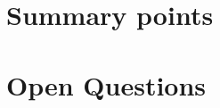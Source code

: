 \documentclass[11pt]{article}
\title{$TITLE}
\author{Aleksandr}
\date{\today}
\begin{document}
\maketitle

\section*{Summary points}
\begin{itemize}
\end{itemize}

\section*{Open Questions}
\begin{itemize}
\end{itemize}
\end{document}
